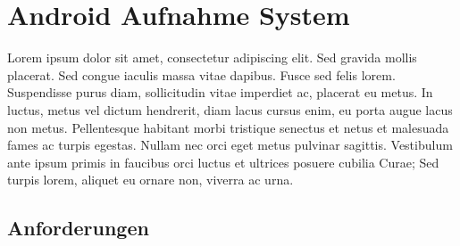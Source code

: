 \chapter{Android Aufnahme System}

Lorem ipsum dolor sit amet, consectetur adipiscing elit. Sed gravida mollis placerat. Sed congue iaculis massa vitae dapibus. Fusce sed felis lorem. Suspendisse purus diam, sollicitudin vitae imperdiet ac, placerat eu metus. In luctus, metus vel dictum hendrerit, diam lacus cursus enim, eu porta augue lacus non metus. Pellentesque habitant morbi tristique senectus et netus et malesuada fames ac turpis egestas. Nullam nec orci eget metus pulvinar sagittis. Vestibulum ante ipsum primis in faucibus orci luctus et ultrices posuere cubilia Curae; Sed turpis lorem, aliquet eu ornare non, viverra ac urna.

\section{Anforderungen}

